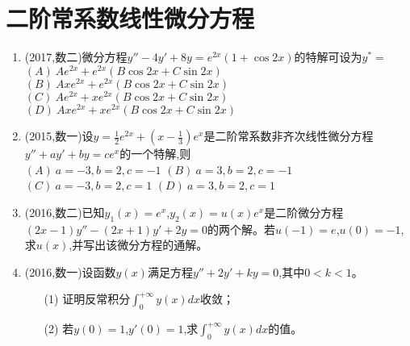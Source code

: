 \documentclass[12pt, a4paper, oneside, UTF8]{ctexbook}
\begin{document}
\section{二阶常系数线性微分方程}

\begin{enumerate}[label=\arabic*.,start=8]
    \item (2017,数二)微分方程$y''-4y'+8y=e^{2x}(1+\cos2x)$的特解可设为$y^*=$ \\
        $(A)\ Ae^{2x}+e^{2x}(B\cos2x+C\sin2x)$ \\
        $(B)\ Axe^{2x}+e^{2x}(B\cos2x+C\sin2x)$ \\
        $(C)\ Ae^{2x}+xe^{2x}(B\cos2x+C\sin2x)$ \\
        $(D)\ Axe^{2x}+xe^{2x}(B\cos2x+C\sin2x)$
    
    \begin{solution}
    \newpage
    \end{solution}
    
    \item (2015,数一)设$y=\frac{1}{2}e^{2x}+(x-\frac{1}{3})e^x$是二阶常系数非齐次线性微分方程$y''+ay'+by=ce^x$的一个特解,则 \\
    $(A)\ a=-3,b=2,c=-1$ \qquad
    $(B)\ a=3,b=2,c=-1$ \\
    $(C)\ a=-3,b=2,c=1$ \qquad
    $(D)\ a=3,b=2,c=1$ 
    
    \begin{solution}
    \newpage
    \end{solution}
    
    \item (2016,数二)已知$y_1(x)=e^x$,$y_2(x)=u(x)e^x$是二阶微分方程$(2x-1)y''-(2x+1)y'+2y=0$的两个解。若$u(-1)=e$,$u(0)=-1$,求$u(x)$,并写出该微分方程的通解。
    
    \begin{solution}
    \newpage
    \end{solution}
    
    \item (2016,数一)设函数$y(x)$满足方程$y''+2y'+ky=0$,其中$0<k<1$。
    \begin{enumerate}[label=(\roman*)]
        \item[(1)] 证明反常积分$\int_0^{+\infty}y(x)dx$收敛；
        \item[(2)] 若$y(0)=1$,$y'(0)=1$,求$\int_0^{+\infty}y(x)dx$的值。
    \end{enumerate}
    
    \begin{solution}
    \newpage
    \end{solution}
\end{enumerate}
\end{document}
